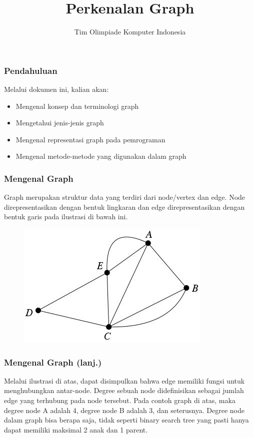 

\title{Perkenalan Graph}
\author{Tim Olimpiade Komputer Indonesia}
\date{}

\usepackage{verbatim}



\begin{frame}
\titlepage
\end{frame}

\begin{frame}
\frametitle{Pendahuluan}
Melalui dokumen ini, kalian akan:
\begin{itemize}
  \item Mengenal konsep dan terminologi graph
  \item Mengetahui jenis-jenis graph
  \item Mengenal representasi graph pada pemrograman
  \item Mengenal metode-metode yang digunakan dalam graph
\end{itemize}

\end{frame}

\begin{frame}
\frametitle{Mengenal Graph}
Graph merupakan struktur data yang terdiri dari \alert{node/vertex} dan \alert{edge}. Node direpresentasikan dengan bentuk lingkaran dan edge direpresentasikan dengan bentuk garis pada ilustrasi di bawah ini.

\begin{figure}
  \centering
  \includegraphics[width=6 cm]{asset/graph.jpg}
\end{figure}
\end{frame}

\begin{frame}
\frametitle{Mengenal Graph (lanj.)}
Melalui ilustrasi di atas, dapat disimpulkan bahwa edge memiliki fungsi untuk menghubungkan antar-node. \alert{Degree} sebuah node didefinisikan sebagai jumlah edge yang terhubung pada node tersebut.\newline\newline
Pada contoh graph di atas, maka degree node A adalah 4, degree node B adalah 3, dan seterusnya. Degree node dalam graph bisa berapa saja, tidak seperti binary search tree yang pasti hanya dapat memiliki maksimal 2 anak dan 1 parent. 
\end{frame}

